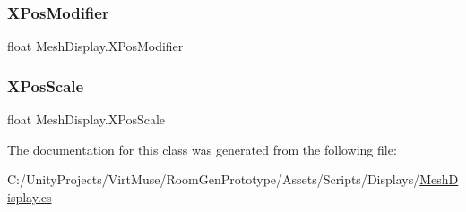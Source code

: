 \subsubsection{\texorpdfstring{X\+Pos\+Modifier}{XPosModifier}}
{\footnotesize\ttfamily float Mesh\+Display.\+X\+Pos\+Modifier\hspace{0.3cm}{\ttfamily [static]}}

\mbox{\label{class_mesh_display_a13c5ad03c68d0b4519bfb8ca23ac6f11}} 
\subsubsection{\texorpdfstring{X\+Pos\+Scale}{XPosScale}}
{\footnotesize\ttfamily float Mesh\+Display.\+X\+Pos\+Scale\hspace{0.3cm}{\ttfamily [static]}}



The documentation for this class was generated from the following file\+:\begin{DoxyCompactItemize}
\item 
C\+:/\+Unity\+Projects/\+Virt\+Muse/\+Room\+Gen\+Prototype/\+Assets/\+Scripts/\+Displays/\mbox{\hyperlink{_mesh_display_8cs}{Mesh\+Display.\+cs}}\end{DoxyCompactItemize}
